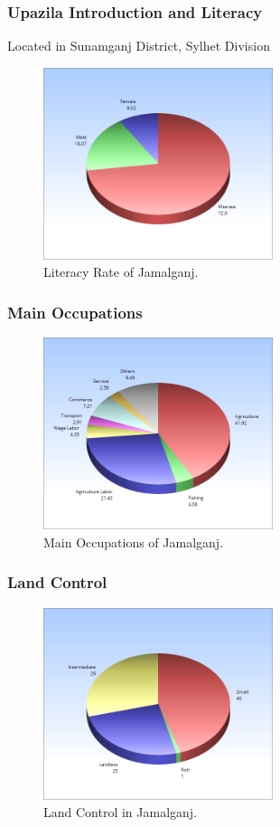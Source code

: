 \documentclass{beamer}
\begin{document}
\begin{frame}
\frametitle{Upazila Introduction and Literacy}
Located in Sunamganj District, Sylhet Division
\begin{figure}
\includegraphics[width=0.6\textwidth]{g1.png}
\caption{Literacy Rate of Jamalganj.}
\end{figure}
\end{frame}

\begin{frame}
\frametitle{Main Occupations}
\begin{figure}[h]
\includegraphics[width=0.6\textwidth]{g2.png}
\caption{Main Occupations of Jamalganj.}
\end{figure}
\end{frame}

\begin{frame}
\frametitle{Land Control}
\begin{figure}[h]
\includegraphics[width=0.6\textwidth]{g3.png}
\caption{Land Control in Jamalganj.}
\end{figure}

\end{frame}
\end{document}
